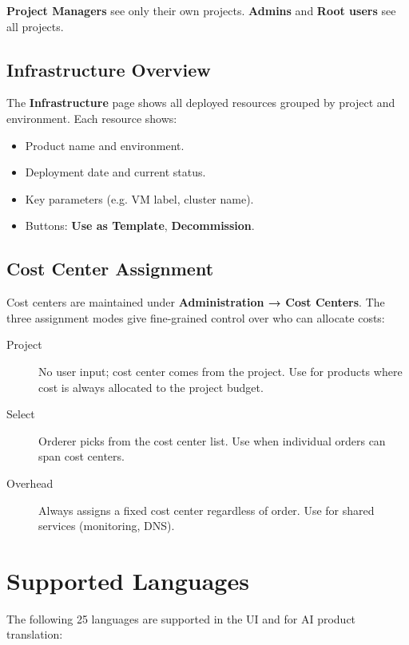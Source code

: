 \documentclass[12pt,a4paper,twoside]{report}
\newcommand{\role}[1]{\textsf{\textbf{#1}}}
\begin{document}
\role{Project Managers} see only their own projects.
\role{Admins} and \role{Root users} see all projects.

\section{Infrastructure Overview}
\label{sec:infra-overview}

The \textbf{Infrastructure} page shows all deployed resources grouped by
project and environment. Each resource shows:
\begin{itemize}
  \item Product name and environment.
  \item Deployment date and current status.
  \item Key parameters (e.g. VM label, cluster name).
  \item Buttons: \textbf{Use as Template}, \textbf{Decommission}.
\end{itemize}

\section{Cost Center Assignment}

Cost centers are maintained under \textbf{Administration → Cost Centers}.
The three assignment modes give fine-grained control over who can
allocate costs:

\begin{description}
  \item[Project] No user input; cost center comes from the project.
        Use for products where cost is always allocated to the project
        budget.
  \item[Select] Orderer picks from the cost center list. Use when
        individual orders can span cost centers.
  \item[Overhead] Always assigns a fixed cost center regardless of
        order. Use for shared services (monitoring, DNS).
\end{description}

\appendix

\chapter{Supported Languages}
\label{app:languages}

The following 25 languages are supported in the UI and for AI product
translation:
\end{document}
